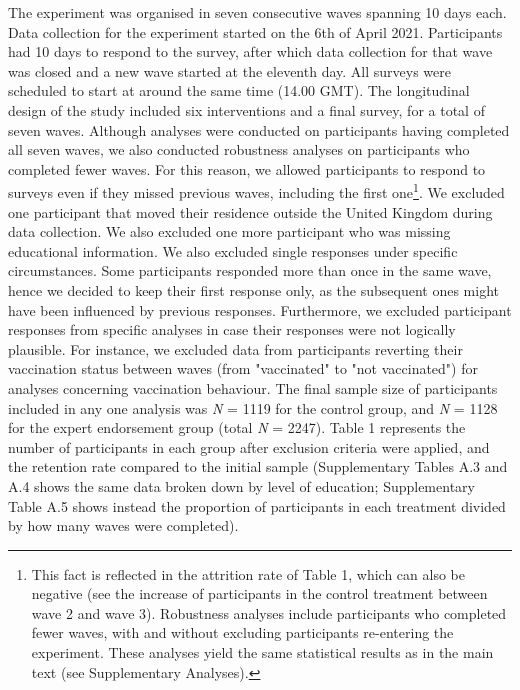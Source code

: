 \documentclass[authordate, empirical]{jote-new-article}
\begin{document}
The experiment was organised in seven consecutive waves spanning 10 days each. Data collection for the experiment started on the 6th of April 2021. Participants had 10 days to respond to the survey, after which data collection for that wave was closed and a new wave started at the eleventh day. All surveys were scheduled to start at around the same time (14.00 GMT). The longitudinal design of the study included six interventions and a final survey, for a total of seven waves. Although analyses were conducted on participants having completed all seven waves, we also conducted robustness analyses on participants who completed fewer waves. For this reason, we allowed participants to respond to surveys even if they missed previous waves, including the first one\footnote{ This fact is reflected in the attrition rate of Table 1, which can also be negative (see the increase of participants in the control treatment between wave 2 and wave 3). Robustness analyses include participants who completed fewer waves, with and without excluding participants re-entering the experiment. These analyses yield the same statistical results as in the main text (see Supplementary Analyses).}. We excluded one participant that moved their residence outside the United Kingdom during data collection. We also excluded one more participant who was missing educational information. We also excluded single responses under specific circumstances. Some participants responded more than once in the same wave, hence we decided to keep their first response only, as the subsequent ones might have been influenced by previous responses. Furthermore, we excluded participant responses from specific analyses in case their responses were not logically plausible. For instance, we excluded data from participants reverting their vaccination status between waves (from "vaccinated" to "not vaccinated") for analyses concerning vaccination behaviour. The final sample size of participants included in any one analysis was \emph{N }= 1119 for the control group, and \emph{N }= 1128 for the expert endorsement group (total \emph{N }= 2247). Table 1 represents the number of participants in each group after exclusion criteria were applied, and the retention rate compared to the initial sample (Supplementary Tables A.3 and A.4 shows the same data broken down by level of education; Supplementary Table A.5 shows instead the proportion of participants in each treatment divided by how many waves were completed).
\end{document}
